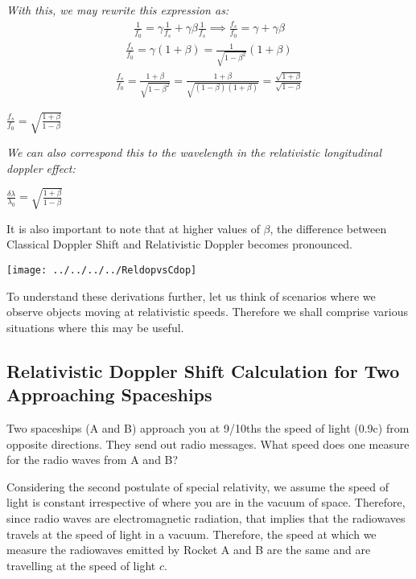 \documentclass{article}
\begin{document}
\textit{With this, we may rewrite this expression as:}
\begin{gather*}
\frac{1}{f_0} = \gamma\frac{1}{f_s} + \gamma\beta\frac{1}{f_s} \implies \frac{f_s}{f_0} = \gamma + \gamma\beta
\end{gather*}
\begin{gather*}
\frac{f_s}{f_0} = \gamma(1+\beta) = \frac{1}{\sqrt{1-\beta^2}}(1+\beta)
\end{gather*}
\begin{gather*}
	\frac{f_s}{f_0} = \frac{1+\beta}{\sqrt{1-\beta^2}} = \frac{1+\beta}{\sqrt{(1-\beta)(1+\beta)}} = \frac{\sqrt{1+\beta}}{\sqrt{1-\beta}}
\end{gather*}
\begin{center}
	$\boxed{\frac{f_s}{f_0} = \sqrt{\frac{1+\beta}{1-\beta}}}
	$
\end{center}
\textit{We can also correspond this to the wavelength in the relativistic longitudinal doppler effect: }
\begin{center}
	$\boxed{\frac{\delta\lambda}{\lambda_0} = \sqrt{\frac{1+\beta}{1-\beta}}}
$
\end{center}
\newpage
It is also important to note that at higher values of $\beta$, the difference between Classical Doppler Shift and Relativistic Doppler becomes pronounced.
\begin{center}

	\texttt{[image: ../../../../ReldopvsCdop]}

\end{center}



To understand these derivations further, let us think of scenarios where we observe objects moving at relativistic speeds. Therefore we shall comprise various situations where this may be useful.

\subsection{Relativistic Doppler Shift Calculation for Two Approaching Spaceships}

Two spaceships (A and B) approach you at 9/10ths the speed of light (0.9c) from opposite directions. They send out radio messages. What speed does one measure for the radio waves from A and B? 


Considering the second postulate of special relativity, we assume the speed of light is constant irrespective of where you are in the vacuum of space. Therefore, since radio waves are electromagnetic radiation, that implies that the radiowaves travels at the speed of light in a vacuum. Therefore, the speed at which we measure the radiowaves emitted by Rocket A and B are the same and are travelling at the speed of light $c$. 
\end{document}
